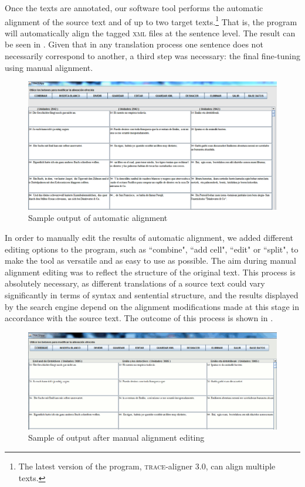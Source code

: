 \documentclass[output=paper]{LSP/langsci}
\begin{document}
Once the texts are annotated, our software tool performs the automatic alignment of the source text and of up to two target texts.\footnote{The latest version of the program, \textsc{trace}-aligner 3.0, can align multiple texts.}  That is, the program will automatically align the tagged \textsc{xml} files at the sentence level. The result can be seen in . Given that in any translation process one sentence does not necessarily correspond to another, a third step was necessary: the final fine-tuning using manual alignment.

\begin{figure}[htp] 
\includegraphics[width=1.0\textwidth]{./figures/6-3.png}
\caption{Sample output of automatic alignment} \label{fig:3:3}
\end{figure}

In order to manually edit the results of automatic alignment, we added different editing options to the program, such as “combine", “add cell", “edit" or “split", to make the tool as versatile and as easy to use as possible. The aim during manual alignment editing was to reflect the structure of the original text. This process is absolutely necessary, as different translations of a source text could vary significantly in terms of syntax and sentential structure, and the results displayed by the search engine depend on the alignment modifications made at this stage in accordance with the source text. The outcome of this process is shown in .

\begin{figure}
\includegraphics[width=1.0\textwidth]{./figures/6-4.png}
\caption{Sample of output after manual alignment editing} \label{fig:3:4}
\end{figure}
\end{document}
